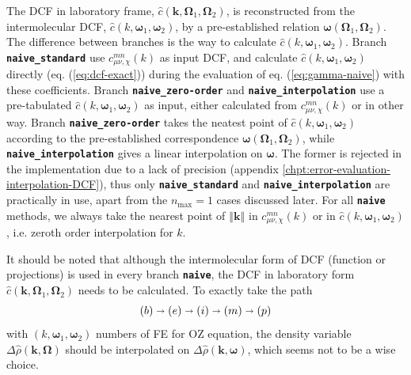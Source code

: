 The \acs{DCF} in laboratory frame, $\hat{c}(\mathbf{k},\mathbf{\Omega}_{1},\mathbf{\Omega}_{2})$,
is reconstructed from the intermolecular \acs{DCF}, $\hat{c}(k,\boldsymbol{\omega}_{1},\boldsymbol{\omega}_{2})$,
by a pre-established relation $\boldsymbol{\omega}(\mathbf{\Omega}_{1},\mathbf{\Omega}_{2})$.
The difference between branches is the way to calculate $\hat{c}(k,\boldsymbol{\omega}_{1},\boldsymbol{\omega}_{2})$.
Branch\textbf{ }\texttt{\textbf{naive\_standard}} use $c_{\mu\nu,\chi}^{mn}(k)$
as input \acs{DCF}, and calculate $\hat{c}(k,\boldsymbol{\omega}_{1},\boldsymbol{\omega}_{2})$
directly (eq. (\ref{eq:dcf-exact})) during the evaluation of eq.
(\ref{eq:gamma-naive}) with these coefficients. Branch \texttt{\textbf{naive\_zero-order}}
and \texttt{\textbf{naive\_interpolation}} use a pre-tabulated $\hat{c}(k,\boldsymbol{\omega}_{1},\boldsymbol{\omega}_{2})$
as input, either calculated from $c_{\mu\nu,\chi}^{mn}(k)$ or in
other way. Branch \texttt{\textbf{naive\_zero-order}} takes the neatest
point of $\hat{c}(k,\boldsymbol{\omega}_{1},\boldsymbol{\omega}_{2})$
according to the pre-established correspondence $\boldsymbol{\omega}(\mathbf{\Omega}_{1},\mathbf{\Omega}_{2})$,
while \texttt{\textbf{naive\_interpolation}} gives a linear interpolation
on $\boldsymbol{\omega}$. The former is rejected in the implementation
due to a lack of precision (appendix \ref{chpt:error-evaluation-interpolation-DCF}),
thus only\textbf{ }\texttt{\textbf{naive\_standard}} and \texttt{\textbf{naive\_interpolation}}
are practically in use, apart from the $n_{\max}=1$ cases discussed
later. For all \texttt{\textbf{naive}} methods, we always take the
nearest point of $\left\Vert \mathbf{k}\right\Vert $ in $c_{\mu\nu,\chi}^{mn}(k)$
or in $\hat{c}(k,\boldsymbol{\omega}_{1},\boldsymbol{\omega}_{2})$,
i.e. zeroth order interpolation for $k$.

It should be noted that although the intermolecular form of \acs{DCF}
(function or projections) is used in every branch \texttt{\textbf{naive}},
the \acs{DCF} in laboratory form $\hat{c}(\mathbf{k},\mathbf{\Omega}_{1},\mathbf{\Omega}_{2})$
needs to be calculated. To exactly take the path
\[
\left(b\right)\shortrightarrow\left(e\right)\shortrightarrow\left(i\right)\shortrightarrow\left(m\right)\shortrightarrow\left(p\right)
\]
with $(k,\boldsymbol{\omega}_{1},\boldsymbol{\omega}_{2})$ numbers
of \acs{FE} for \acs{OZ} equation, the density variable $\Delta\hat{\rho}(\mathbf{k},\mathbf{\Omega})$
should be interpolated on $\Delta\hat{\rho}(\mathbf{k},\boldsymbol{\omega})$,
which seems not to be a wise choice.

